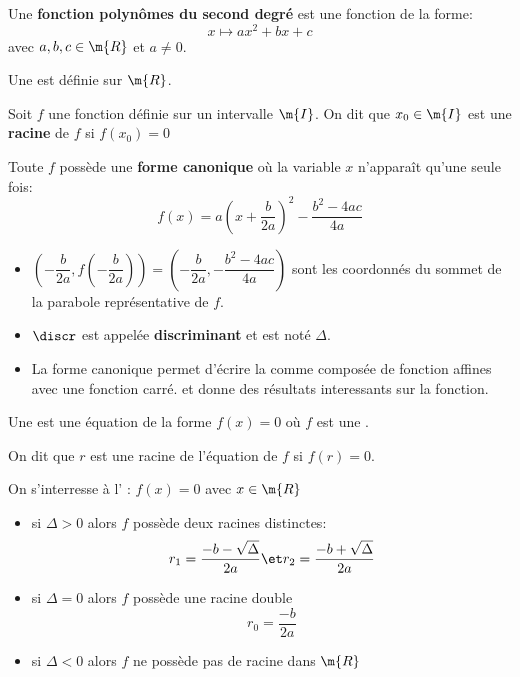 \def\theme{Fonctions polynômes du second degré. Équations et inéquations du second degré.}
\def\date{11/10/2023}

\hbox{}


Une \textbf{fonction polynômes du second degré} est une fonction de la forme:
\begin{equation*}
    x \mapsto ax^2+bx+c
\end{equation*}
avec $a,b,c\in\m{R}$ et $a\ne0$.

\rmq{}
Une  est définie sur $\m{R}$.

Soit $f$ une fonction définie sur un intervalle $\m{I}$. On dit que $x_0\in\m{I}$ est une \textbf{racine} de $f$ si $f(x_0)=0$

Toute  $f$ possède une \textbf{forme canonique} où la variable $x$ n'apparaît qu'une seule fois:
\begin{equation*}
    f(x) = a(x+\dfrac{b}{2a})^2 - \dfrac{b^2-4ac}{4a}
\end{equation*}

\rmq{}
\begin{itemize}
    \item $(-\dfrac{b}{2a},f(-\dfrac{b}{2a})) = (-\dfrac{b}{2a},-\dfrac{b^2-4ac}{4a})$ 
sont les coordonnés du sommet de la parabole représentative de $f$.
    \item $\discr$ est appelée \textbf{discriminant} et est noté $\Delta$.
    \item La forme canonique permet d'écrire la  comme composée de fonction affines avec une fonction carré.
et donne des résultats interessants sur la fonction.
\end{itemize}

\newpage
\hbox{}
Une \textbf{} est une équation de la forme $f(x) = 0$ où $f$ est une .

On dit que $r$ est une racine de l'équation de $f$ si $f(r)=0$.

On s'interresse à l' : $f(x)=0$ avec $x\in\m{R}$
\begin{itemize}
    \item si $\Delta>0$ alors $f$ possède deux racines distinctes:
    \begin{equation*}
        r_1 = \dfrac{-b-\sqrt{\Delta}}{2a} \et r_2 = \dfrac{-b+\sqrt{\Delta}}{2a}
    \end{equation*}
    \item si $\Delta=0$ alors $f$ possède une racine double
    \begin{equation*}
        r_0 = \dfrac{-b}{2a}
    \end{equation*}
    \item si $\Delta<0$ alors $f$ ne possède pas de racine dans $\m{R}$
\end{itemize}

